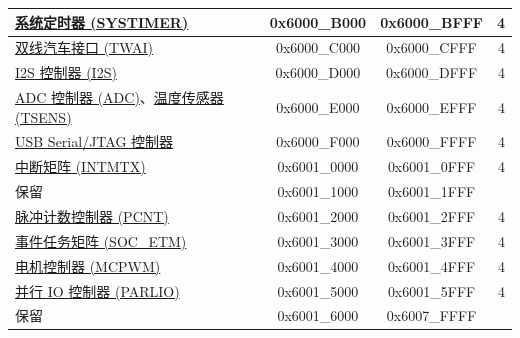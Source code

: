 \begin{ThreePartTable}
\begin{longtable}[c]{ |p{7cm}|c|c|r| }
\hyperref[mod:systimer]{系统定时器 (SYSTIMER)}                    & 0x6000\_B000 & 0x6000\_BFFF &   4        \\\hline
\hyperref[mod:twai]{双线汽车接口 (TWAI)}                      & 0x6000\_C000 & 0x6000\_CFFF &   4        \\\hline
\hyperref[mod:i2s]{I2S 控制器 (I2S)}            & 0x6000\_D000 & 0x6000\_DFFF &   4     \\\hline
\hyperref[mod:adc]{ADC 控制器 (ADC)}、\hyperref[mod:tmpsen]{温度传感器 (TSENS)}             & 0x6000\_E000 & 0x6000\_EFFF &   4        \\\hline
\hyperref[mod:usbserialjtag]{USB Serial/JTAG 控制器}                  & 0x6000\_F000 & 0x6000\_FFFF &   4     \\\hline

\hyperref[mod:intmtrx]{中断矩阵 (INTMTX)}            & 0x6001\_0000 & 0x6001\_0FFF &   4     \\\hline

    \rowcolor{gray!25}  保留                    & 0x6001\_1000 & 0x6001\_1FFF &        \\\hline
\hyperref[mod:pcnt]{脉冲计数控制器 (PCNT)}& 0x6001\_2000 & 0x6001\_2FFF &   4        \\\hline
\hyperref[mod:evntaskmatrix]{事件任务矩阵 (SOC\_ETM)} & 0x6001\_3000 & 0x6001\_3FFF &   4     \\\hline
\hyperref[mod:mcpwm]{电机控制器 (MCPWM)} & 0x6001\_4000 & 0x6001\_4FFF &   4     \\\hline
\hyperref[mod:parlio]{并行 IO 控制器 (PARLIO) }                    & 0x6001\_5000 & 0x6001\_5FFF &   4        \\\hline
    \rowcolor{gray!25}  保留                    & 0x6001\_6000 & 0x6007\_FFFF &        \\\hline


\end{longtable}
\end{ThreePartTable}
